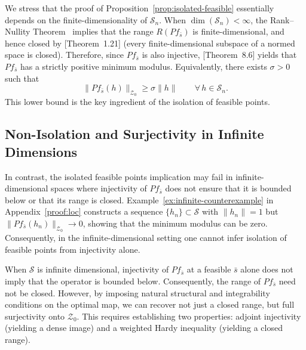 \documentclass[12pt,leqno]{amsart}
\begin{document}
We stress that the proof of Proposition~\ref{prop:isolated-feasible} essentially depends on the finite-dimensionality of $\mathcal{S}_n$.
When $\dim(\mathcal{S}_n)<\infty$, the Rank--Nullity Theorem~\citep{hoffmann1971linear} implies that the range $R(Pf_{\bar{s}})$ is finite-dimensional, and hence closed by \cite{Rudin1974FunctionalAnalysis}[Theorem~1.21] (every finite-dimensional subspace of a normed space is closed).
Therefore, since $Pf_{\bar{s}}$ is also injective, \cite{hildebrand2012methods}[Theorem~8.6] yields that $Pf_{\bar{s}}$ has a strictly positive minimum modulus.
Equivalently, there exists $\sigma>0$ such that
\[
\|Pf_{\bar{s}}(h)\|_{\mathcal{Z}_0}\ge \sigma\|h\|\qquad \forall\,h\in\mathcal{S}_n.
\]
This lower bound is the key ingredient of the isolation of feasible points.

\subsection{Non-Isolation and Surjectivity in Infinite Dimensions}
In contrast, the isolated feasible points implication may fail in infinite-dimensional spaces where injectivity of $Pf_{\bar{s}}$ does not ensure that it is bounded below or that its range is closed.
Example~\ref{ex:infinite-counterexample} in Appendix~\ref{proof:loc} constructs a sequence $\{h_n\}\subset \mathcal{S}$ with $\|h_n\|=1$ but
$\|Pf_{\bar{s}}(h_n)\|_{\mathcal{Z}_0}\to 0$, showing that the minimum modulus can be zero.
Consequently, in the infinite-dimensional setting one cannot infer isolation of feasible points from injectivity alone. 

When $\mathcal{S}$ is infinite dimensional, injectivity of $Pf_{\bar{s}}$ at a feasible $\bar{s}$ alone does not imply that the operator is bounded below. Consequently, the range of $Pf_{\bar{s}}$ need not be closed. However, by imposing natural structural and integrability conditions on the optimal map, we can recover not just a closed range, but full surjectivity onto $\mathcal{Z}_0$. This requires establishing two properties: adjoint injectivity (yielding a dense image) and a weighted Hardy inequality (yielding a closed range).
\end{document}
